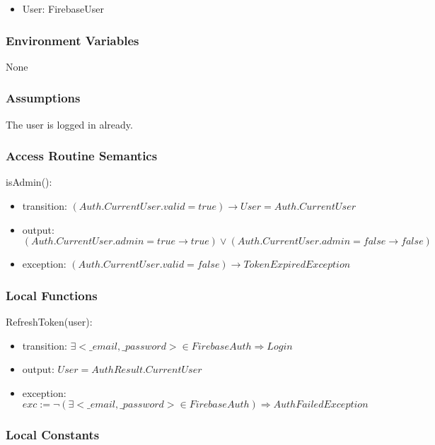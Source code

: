 \documentclass[12pt, titlepage]{article}
\begin{document}
\begin{itemize}
\item User: FirebaseUser
\end{itemize}

\subsubsection{Environment Variables}

None

\subsubsection{Assumptions}

The user is logged in already.

\subsubsection{Access Routine Semantics}

\noindent isAdmin():
\begin{itemize}
\item transition: $(Auth.CurrentUser.valid = true) \rightarrow User = Auth.CurrentUser$ 
\item output: $(Auth.CurrentUser.admin = true \rightarrow true) \lor (Auth.CurrentUser.admin = false \rightarrow false)$
\item exception: $(Auth.CurrentUser.valid = false) \rightarrow TokenExpiredException$
\end{itemize}

\subsubsection{Local Functions}

\noindent RefreshToken(user):
\begin{itemize}
\item transition: $\exists <\_email, \_password> \in FirebaseAuth \Rightarrow Login$
\item output: $User = AuthResult.CurrentUser$
\item exception: $exc:= \lnot(\exists <\_email, \_password> \in FirebaseAuth) \Rightarrow AuthFailedException$
\end{itemize}

\subsubsection{Local Constants}
\end{document}
